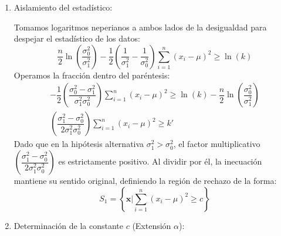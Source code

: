\begin{enumerate}[label=\color{red}\textbf{\arabic*)}]
\begin{enumerate}[label=\arabic*)]
		            El lema establece que la región de rechazo $S_1$ del test de máxima potencia cumple la condición: \[
			            \dfrac{L(\mathbf{x};\sigma_1^2)}{L(\mathbf{x};\sigma_0^2)}\ge k
		            \]
		            Sustituyendo las verosimilitudes: \[
			            \dfrac{(2\pi\sigma_1^2)^{-n / 2}\exp \left( -\frac{1}{2\sigma_1^2} \sum_{i=1}^{n} (x_{i}-\mu)^2 \right) }{(2\pi\sigma_0^2)^{-n / 2}\exp \left( -\frac{1}{2\sigma_0^2}\sum_{i=1}^{n} (x_{i}-\mu)^2  \right) }\ge k
		            \]
		            Simplificando los términos constantes: \[
			            \left( \dfrac{\sigma_0^2}{\sigma_1^2} \right) ^{n / 2}\exp \left( -\dfrac{1}{2}\left( \dfrac{1}{\sigma_1^2}-\dfrac{1}{\sigma_0^2} \right) \sum_{i=1}^{n} (x_{i}-\mu)^2 \right) \ge k
		            \]
		      \item Aislamiento del estadístico:

		            Tomamos logaritmos neperianos a ambos lados de la desigualdad para despejar el estadístico de los datos: \[
			            \dfrac{n}{2} \ln \left( \dfrac{\sigma_0^2}{\sigma_1^2} \right) -\dfrac{1}{2}\left( \dfrac{1}{\sigma_1^2}-\dfrac{1}{\sigma_0^2} \right) \sum_{i=1}^{n} (x_{i}-\mu)^2\ge \ln(k)
		            \]
		            Operamos la fracción dentro del paréntesis: \[
			            \begin{array}{c}
				            -\dfrac{1}{2}\left( \dfrac{\sigma_0^2-\sigma_1^2}{\sigma_1^2\sigma_0^2} \right) \sum_{i=1}^{n} (x_{i}-\mu)^2\ge \ln(k)-\dfrac{n}{2}\ln \left( \dfrac{\sigma_0^2}{\sigma_1^2} \right) \\
				            \left( \dfrac{\sigma_1^2-\sigma_0^2}{2\sigma_1^2\sigma_0^2} \right) \sum_{i=1}^{n} (x_{i}-\mu)^2\ge k'
			            \end{array}
		            \]
		            Dado que en la hipótesis alternativa $\sigma_1^2>\sigma_0^2$, el factor multiplicativo $\left( \dfrac{\sigma_1^2-\sigma_0^2}{2\sigma_1^2\sigma_0^2} \right)$ es estrictamente positivo. Al dividir por él, la inecuación mantiene su sentido original, definiendo la región de rechazo de la forma: \[
			            S_1=\left\{ \mathbf{x}\bigg| \sum_{i=1}^{n} (x_{i}-\mu)^2\ge c \right\}
		            \]
		      \item Determinación de la constante $c$ (Extensión $\alpha$):


\end{enumerate}
\end{enumerate}
